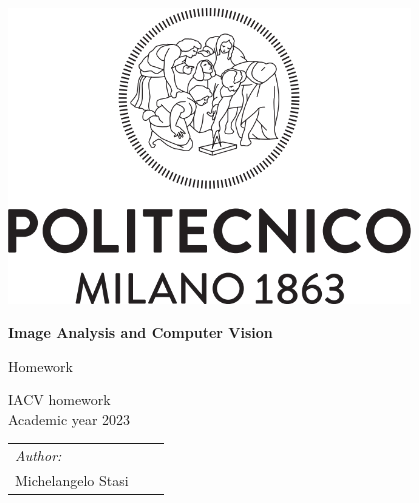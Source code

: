 \documentclass[a4paper, 11pt, oneside, openright, english]{book}
\begin{document}
\begin{titlepage}
    \begin{center}
        \includegraphics[width=0.8\textwidth]{../images/PoliMi_Logo.png}

        \vspace*{2cm}
        \textbf{\huge Image Analysis and Computer Vision}

        \vspace{0.5cm}
        \LARGE Homework 

        \vspace{1.5cm}
        \normalsize IACV homework\\
        Academic year 2023 


        \vspace{1cm}
        \small
        \begin{table}[b]
            \centering
            \begin{tabular}{l p{5.5cm} l}
                \textit{Author:}   &  \\
                Michelangelo Stasi  & 
            \end{tabular}
        \end{table}

    \end{center}
\end{titlepage}

\tableofcontents
\end{document}

